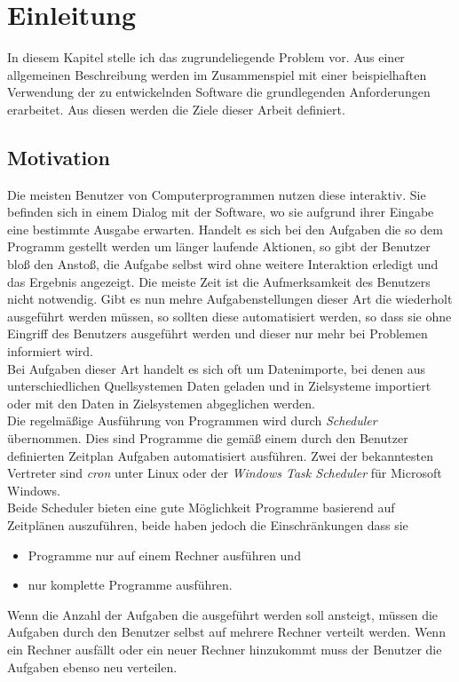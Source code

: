 \chapter{Einleitung}\label{chap:Einleitung}
\chapterstart
In diesem Kapitel stelle ich das zugrundeliegende Problem vor. Aus einer allgemeinen Beschreibung werden im Zusammenspiel mit einer beispielhaften Verwendung der zu entwickelnden Software die grundlegenden Anforderungen erarbeitet. Aus diesen werden die Ziele dieser Arbeit definiert.
\section{Motivation}
Die meisten Benutzer von Computerprogrammen nutzen diese interaktiv. Sie befinden sich in einem Dialog mit der Software, wo sie aufgrund ihrer Eingabe eine bestimmte Ausgabe erwarten. Handelt es sich bei den Aufgaben die so dem Programm gestellt werden um länger laufende Aktionen, so gibt der Benutzer bloß den Anstoß, die Aufgabe selbst wird ohne weitere Interaktion erledigt und das Ergebnis angezeigt. Die meiste Zeit ist die Aufmerksamkeit des Benutzers nicht notwendig. Gibt es nun mehre Aufgabenstellungen dieser Art die wiederholt ausgeführt werden müssen, so sollten diese automatisiert werden, so dass sie ohne Eingriff des Benutzers ausgeführt werden und dieser nur mehr bei Problemen informiert wird.\\
Bei Aufgaben dieser Art handelt es sich oft um Datenimporte, bei denen aus unterschiedlichen Quellsystemen Daten geladen und in Zielsysteme importiert oder mit den Daten in Zielsystemen abgeglichen werden.\\
Die regelmäßige Ausführung von Programmen wird durch \emph{Scheduler} übernommen. Dies sind Programme die gemäß einem durch den Benutzer definierten Zeitplan Aufgaben automatisiert ausführen. Zwei der bekanntesten Vertreter sind \emph{cron} unter Linux oder der \emph{Windows Task Scheduler} für Microsoft Windows.\\
Beide Scheduler bieten eine gute Möglichkeit Programme basierend auf Zeitplänen auszuführen, beide haben jedoch die Einschränkungen dass sie
\begin{itemize}
	\item Programme nur auf einem Rechner ausführen und
	\item nur komplette Programme ausführen.
\end{itemize}
Wenn die Anzahl der Aufgaben die ausgeführt werden soll ansteigt, müssen die Aufgaben durch den Benutzer selbst auf mehrere Rechner verteilt werden. Wenn ein Rechner ausfällt oder ein neuer Rechner hinzukommt muss der Benutzer die Aufgaben ebenso neu verteilen.\\
